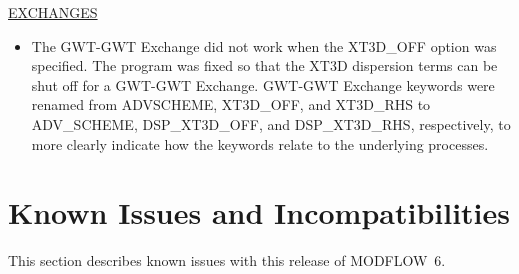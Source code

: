 \documentclass[11pt,twoside,twocolumn]{usgsreport}
\begin{document}
\begin{itemize}

	\underline{EXCHANGES}
	\begin{itemize}
		\item The GWT-GWT Exchange did not work when the XT3D\_OFF option was specified.  The program was fixed so that the XT3D dispersion terms can be shut off for a GWT-GWT Exchange.  GWT-GWT Exchange keywords were renamed from ADVSCHEME, XT3D\_OFF, and XT3D\_RHS to ADV\_SCHEME, DSP\_XT3D\_OFF, and DSP\_XT3D\_RHS, respectively, to more clearly indicate how the keywords relate to the underlying processes.  
	\end{itemize}

	
\end{itemize}

\section{Known Issues and Incompatibilities}
This section describes known issues with this release of MODFLOW~6.  
\end{document}
